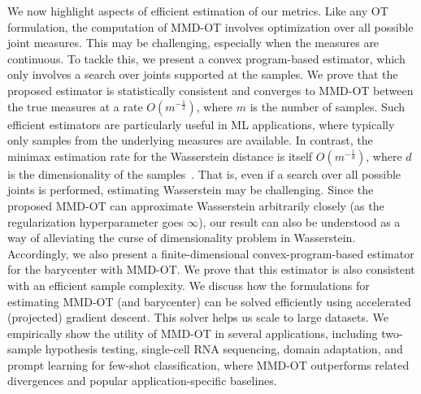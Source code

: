 We now highlight aspects of efficient estimation of our metrics. Like any OT formulation, the computation of MMD-OT involves optimization over all possible joint measures. This may be challenging, especially when the measures are continuous. To tackle this, we present a convex program-based estimator, which only involves a search over joints supported at the samples. We prove that the proposed estimator is statistically consistent and converges to MMD-OT between the true measures at a rate $O\left(m^{-\frac{1}{2}}\right)$, where $m$ is the number of samples. Such efficient estimators are particularly useful in ML applications, where typically only samples from the underlying measures are available. 
In contrast, the minimax estimation rate for the Wasserstein distance is itself $O\left(m^{-\frac{1}{d}}\right)$, where $d$ is the dimensionality of the samples~\citep{dudley1969,nilesweed2019estimation}. That is, even if a search over all possible joints is performed, estimating Wasserstein may be challenging. Since the proposed MMD-OT can approximate Wasserstein arbitrarily closely (as the regularization hyperparameter goes $\infty$), our result can also be understood as a way of alleviating the curse of dimensionality problem in Wasserstein.
Accordingly, we also present a finite-dimensional convex-program-based estimator for the barycenter with MMD-OT. We prove that this estimator is also consistent with an efficient sample complexity. We discuss how the formulations for estimating MMD-OT (and barycenter) can be solved efficiently using accelerated (projected) gradient descent. This solver helps us scale to large datasets. We empirically show the utility of MMD-OT in several applications, including two-sample hypothesis testing, single-cell RNA sequencing, domain adaptation, and prompt learning for few-shot classification, where MMD-OT outperforms related divergences and popular application-specific baselines.
